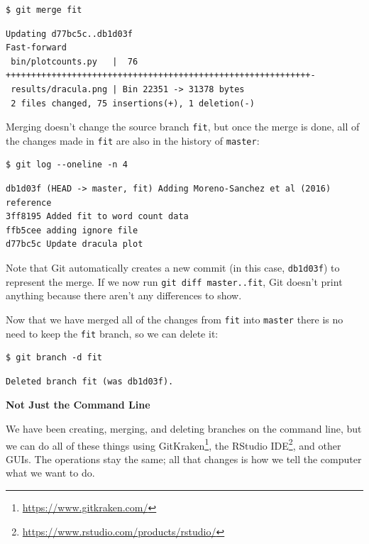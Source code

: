 \documentclass[
]{krantz}
\renewenvironment{quote}{\begin{VF}}{\end{VF}}
\renewcommand{\href}[2]{#2\footnote{\url{#1}}}
\begin{document}
\begin{verbatim}
$ git merge fit
\end{verbatim}

\begin{verbatim}
Updating d77bc5c..db1d03f
Fast-forward
 bin/plotcounts.py   |  76 ++++++++++++++++++++++++++++++++++++++++++++++++++++++++++++-
 results/dracula.png | Bin 22351 -> 31378 bytes
 2 files changed, 75 insertions(+), 1 deletion(-)
\end{verbatim}

Merging doesn't change the source branch \texttt{fit},
but once the merge is done,
all of the changes made in \texttt{fit} are also in the history of \texttt{master}:

\begin{verbatim}
$ git log --oneline -n 4
\end{verbatim}

\begin{verbatim}
db1d03f (HEAD -> master, fit) Adding Moreno-Sanchez et al (2016) reference
3ff8195 Added fit to word count data
ffb5cee adding ignore file
d77bc5c Update dracula plot
\end{verbatim}

Note that Git automatically creates a new commit (in this case, \texttt{db1d03f})
to represent the merge.
If we now run \texttt{git\ diff\ master..fit},
Git doesn't print anything
because there aren't any differences to show.

Now that we have merged all of the changes from \texttt{fit} into \texttt{master}
there is no need to keep the \texttt{fit} branch,
so we can delete it:

\begin{verbatim}
$ git branch -d fit
\end{verbatim}

\begin{verbatim}
Deleted branch fit (was db1d03f).
\end{verbatim}

\begin{quote}
\textbf{Not Just the Command Line}

We have been creating, merging, and deleting branches on the command line,
but we can do all of these things using \href{https://www.gitkraken.com/}{GitKraken},
\href{https://www.rstudio.com/products/rstudio/}{the RStudio IDE},
and other GUIs.
The operations stay the same;
all that changes is how we tell the computer what we want to do.
\end{quote}
\end{document}
